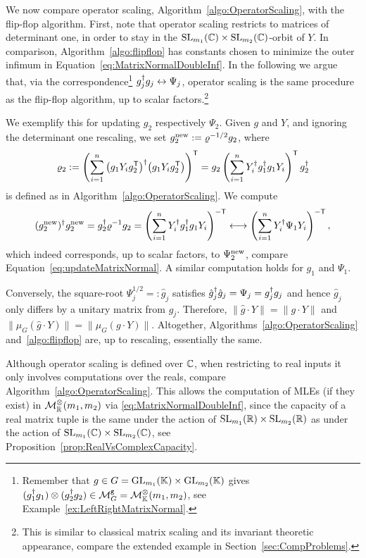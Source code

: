 We now compare operator scaling, Algorithm~\ref{algo:OperatorScaling}, with the flip-flop algorithm.
First, note that operator scaling restricts to matrices of determinant one, in order to stay in the $\operatorname{SL}_{m_1}(\mathbb C) \times \operatorname{SL}_{m_2}(\mathbb C)$-orbit of $Y$. In comparison, Algorithm~\ref{algo:flipflop} has constants chosen to minimize the outer infimum in Equation~\eqref{eq:MatrixNormalDoubleInf}. In the following we argue that, via the correspondence\footnote{Remember that $g \in G = \operatorname{GL}_{m_1}(\mathbb K) \times \operatorname{GL}_{m_2}(\mathbb K)$ gives $(g_1^{\dagger} g_1) \otimes (g_2^{\dagger} g_2) \in \mathcal{M}^{\mathtt{g}}_{G} = \mathcal{M}^{\otimes}_{\mathbb{K}}(m_1,m_2)$, see Example~\ref{ex:LeftRightMatrixNormal}.}
$g_j^{\dagger} g_j \leftrightarrow \Psi_j$, operator scaling is the same procedure as the flip-flop algorithm, up to scalar factors.\footnote{This is similar to classical matrix scaling and its invariant theoretic appearance, compare the extended example in Section~\ref{sec:CompProblems}.}

We exemplify this for updating $g_2$ respectively $\Psi_2$. Given $g$ and $Y$, and ignoring the determinant one rescaling, we set $g_2^{\operatorname{new}} := \varrho^{-1/2} g_2$, where
	\[ \varrho_2 := \left( \sum_{i=1}^n \big( g_1 Y_i g_2^{\mathsf{T}} \big)^{\dagger} \big( g_1 Y_i g_2^{\mathsf{T}} \big) \right)^{\mathsf{T}} = g_2 \left( \sum_{i=1}^n Y_i^{\dagger} g_1^{\dagger} g_1 Y_i \right)^{\mathsf{T}} g_2^{\dagger} \]
is defined as in Algorithm~\ref{algo:OperatorScaling}. We compute
	\[ (g_2^{\operatorname{new}})^{\dagger} g_2^{\operatorname{new}} = g_2^{\dagger} \varrho^{-1} g_2 = \left( \sum_{i=1}^n Y_i^{\dagger} g_1^{\dagger} g_1 Y_i \right)^{-\mathsf{T}}
	\longleftrightarrow \left( \sum_{i=1}^n Y_i^{\dagger} \Psi_1 Y_i \right)^{-\mathsf{T}} , \]
which indeed corresponds, up to scalar factors, to $\Psi_2^{\operatorname{new}}$, compare Equation~\eqref{eq:updateMatrixNormal}. A similar computation holds for $g_1$ and $\Psi_1$.

Conversely, the square-root $\Psi_j^{1/2} =: \hat{g}_j$ satisfies $\hat{g}_j^{\dagger} \hat{g}_j = \Psi_j = g_j^{\dagger} g_j$ and hence $\hat{g}_j$ only differs by a unitary matrix from $g_j$. Therefore, $\| \hat{g} \cdot Y\| = \|g \cdot Y\|$ and $\| \mu_G(\hat{g} \cdot Y)\| = \|\mu_{G}(g \cdot Y)\|$.
Altogether, Algorithms~\ref{algo:OperatorScaling} and~\ref{algo:flipflop} are, up to rescaling, essentially the same.

Although operator scaling is defined over $\mathbb C$, when restricting to real inputs it only involves computations over the reals, compare Algorithm~\ref{algo:OperatorScaling}. This allows the computation of MLEs (if they exist) in $\mathcal{M}^{\otimes}_{\mathbb R}(m_1, m_2)$ via \eqref{eq:MatrixNormalDoubleInf}, since the capacity of a real matrix tuple is the same under the action of $\operatorname{SL}_{m_1}(\mathbb R) \times \operatorname{SL}_{m_2}(\mathbb R)$ as under the action of $\operatorname{SL}_{m_1}(\mathbb C) \times \operatorname{SL}_{m_2}(\mathbb C)$, see Proposition~\ref{prop:RealVsComplexCapacity}.


